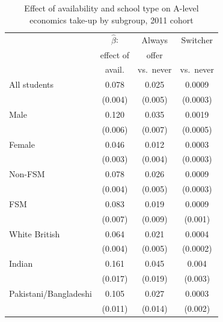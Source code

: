 \begin{table}[htbp]
\centering
\caption{Effect of availability and school type on A-level economics take-up by subgroup, 2011 cohort}
\label{tab:lpm_subgroup}
\begin{tabular}{l ccc}
\toprule
                              & $\hat{\beta}$: & Always     & Switcher   \\
                              & effect of  & offer      &            \\
                              & avail.     & vs.\ never & vs.\ never \\
\midrule
All students                  & 0.078\sym{***}& 0.025\sym{***}& 0.0009\sym{***}\\
                              & (0.004)       & (0.005)       & (0.0003)       \\
\addlinespace
Male                          & 0.120\sym{***}& 0.035\sym{***}& 0.0019\sym{***}\\
                              & (0.006)       & (0.007)       & (0.0005)       \\
Female                        & 0.046\sym{***}& 0.012\sym{***}& 0.0003\\
                              & (0.003)       & (0.004)       & (0.0003)       \\
\addlinespace
Non-FSM                       & 0.078\sym{***}& 0.026\sym{***}& 0.0009\sym{***}\\
                              & (0.004)       & (0.005)       & (0.0003)       \\
FSM                           & 0.083\sym{***}& 0.019\sym{**}& 0.0009\\
                              & (0.007)       & (0.009)       & (0.001)       \\
\addlinespace
White British                 & 0.064\sym{***}& 0.021\sym{***}& 0.0004\sym{*}\\
                              & (0.004)       & (0.005)       & (0.0002)       \\
Indian                        & 0.161\sym{***}& 0.045\sym{**}& 0.004\\
                              & (0.017)       & (0.019)       & (0.003)       \\
Pakistani/Bangladeshi         & 0.105\sym{***}& 0.027\sym{**}& 0.0003\\
                              & (0.011)       & (0.014)       & (0.002)       \\

\end{tabular}
\end{table}
